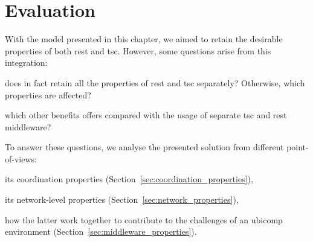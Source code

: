 \section{Evaluation}
\label{sec:middleware_qualitative_evaluation}

With the model presented in this chapter, we aimed to retain the desirable properties of both \ac{rest} and \ac{tsc}. %
However, some questions arise from this integration:
\begin{enumerate*}[label=\itshape(\arabic*\upshape)]
  \item does in fact retain all the properties of \ac{rest} and \ac{tsc} separately? Otherwise, which properties are affected?
  \item which other benefits offers compared with the usage of separate \ac{tsc} and \ac{rest} middleware?
\end{enumerate*}



To answer these questions, we analyse the presented solution from different point-of-views:
\begin{enumerate*}[label=\itshape(\arabic*\upshape)]
  \item its coordination properties (Section~\ref{sec:coordination_properties}),
  \item its network-level properties (Section~\ref{sec:network_properties}),
  \item how the latter work together to contribute to the challenges of an \ac{ubicomp} environment (Section~\ref{sec:middleware_properties}).
\end{enumerate*}




